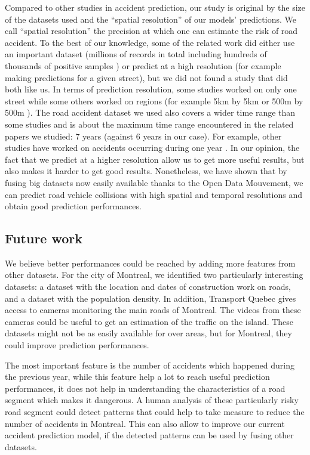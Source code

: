 \documentclass[conference]{IEEEtran}
\begin{document}
Compared to other studies in accident prediction, our study is original by the size of the datasets used and the ``spatial resolution'' of our models' predictions. We call ``spatial resolution'' the precision at which one can estimate the risk of road accident. To the best of our knowledge, some of the related work did either use an important dataset (millions of records in total including hundreds of thousands of positive samples \cite{QChen2016}) or predict at a high resolution (for example making predictions for a given street), but we did not found a study that did both like us. In terms of prediction resolution, some studies worked on only one street \cite{Chang2005} \cite{Chang2005b} \cite{Lin2015} while some others worked on regions (for example 5km by 5km \cite{QChen2016} or 500m by 500m \cite{Yuan2018}). The road accident dataset we used also covers a wider time range than some studies and is about the maximum time range encountered in the related papers we studied: 7 years \cite{Yuan2018} (against 6 years in our case). For example, other studies have worked on accidents occurring during one year \cite{Chang2005} \cite{Chang2005b} \cite{QChen2016} \cite{Lin2015}. In our opinion, the fact that we predict at a higher resolution allow us to get more useful results, but also makes it harder to get good results. Nonetheless, we have shown that by fusing big datasets now easily available thanks to the Open Data Mouvement, we can predict road vehicle collisions with high spatial and temporal resolutions and obtain good prediction performances.

\subsection{Future work}

We believe better performances could be reached by adding more features
from other datasets. For the city of Montreal, we identified two
particularly interesting datasets: a dataset with the location and dates of
construction work on roads, and a dataset with the population density.
In addition, Transport Quebec gives access to cameras monitoring the main
roads of Montreal. The videos from these cameras could be useful to get an
estimation of the traffic on the island. These datasets might not be as
easily available for over areas, but for Montreal, they could improve 
prediction performances.

The most important feature is the number of accidents which happened during
the previous year, while this feature help a lot to reach useful prediction
performances, it does not help in understanding the characteristics of a
road segment which makes it dangerous. A human analysis of these
particularly risky road segment could detect patterns that could help to
take measure to reduce the number of accidents in Montreal. This can also
allow to improve our current accident prediction model, if the detected
patterns can be used by fusing other datasets.
\end{document}
